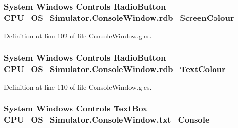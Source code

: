 \subsubsection[{rdb\+\_\+\+Screen\+Colour}]{\setlength{\rightskip}{0pt plus 5cm}System Windows Controls Radio\+Button C\+P\+U\+\_\+\+O\+S\+\_\+\+Simulator.\+Console\+Window.\+rdb\+\_\+\+Screen\+Colour\hspace{0.3cm}{\ttfamily [package]}}\label{class_c_p_u___o_s___simulator_1_1_console_window_a1ce1d3ba71dbca9bee53bf6b9c474787}


Definition at line 102 of file Console\+Window.\+g.\+cs.

\hypertarget{class_c_p_u___o_s___simulator_1_1_console_window_a6086d1a5ddaadd584ec129c7372359e2}{}
\subsubsection[{rdb\+\_\+\+Text\+Colour}]{\setlength{\rightskip}{0pt plus 5cm}System Windows Controls Radio\+Button C\+P\+U\+\_\+\+O\+S\+\_\+\+Simulator.\+Console\+Window.\+rdb\+\_\+\+Text\+Colour\hspace{0.3cm}{\ttfamily [package]}}\label{class_c_p_u___o_s___simulator_1_1_console_window_a6086d1a5ddaadd584ec129c7372359e2}


Definition at line 110 of file Console\+Window.\+g.\+cs.

\hypertarget{class_c_p_u___o_s___simulator_1_1_console_window_ad1d4a0c5f573c7e89c8d6ed57d5097e0}{}
\subsubsection[{txt\+\_\+\+Console}]{\setlength{\rightskip}{0pt plus 5cm}System Windows Controls Text\+Box C\+P\+U\+\_\+\+O\+S\+\_\+\+Simulator.\+Console\+Window.\+txt\+\_\+\+Console\hspace{0.3cm}{\ttfamily [package]}}\label{class_c_p_u___o_s___simulator_1_1_console_window_ad1d4a0c5f573c7e89c8d6ed57d5097e0}


